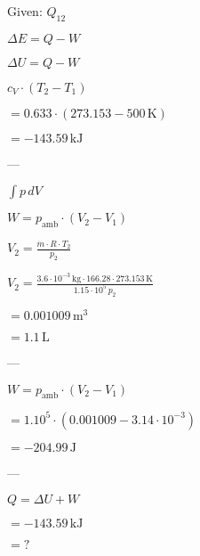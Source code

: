 Given: \( Q_{12} \)

\( \Delta E = Q - W \)

\( \Delta U = Q - W \)

\( c_V \cdot (T_2 - T_1) \)

\( = 0.633 \cdot (273.153 - 500 \, \text{K}) \)

\( = -143.59 \, \text{kJ} \)

---

\( \int p \, dV \)

\( W = p_{\text{amb}} \cdot (V_2 - V_1) \)

\( V_2 = \frac{\dot{m} \cdot R \cdot T_2}{p_2} \)

\( V_2 = \frac{3.6 \cdot 10^{-3} \, \text{kg} \cdot 166.28 \cdot 273.153 \, \text{K}}{1.15 \cdot 10^5 \, p_2} \)

\( = 0.001009 \, \text{m}^3 \)

\( = 1.1 \, \text{L} \)

---

\( W = p_{\text{amb}} \cdot (V_2 - V_1) \)

\( = 1.10^5 \cdot (0.001009 - 3.14 \cdot 10^{-3}) \)

\( = -204.99 \, \text{J} \)

---

\( Q = \Delta U + W \)

\( = -143.59 \, \text{kJ} \)

\( = ? \)